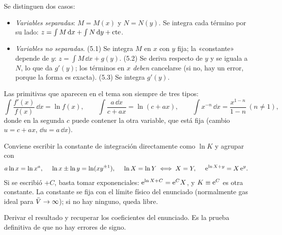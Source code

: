  Se distinguen dos casos:
\begin{itemize}[leftmargin=1.6em]
\item[\textbf{\color{navy}A.}] \emph{Variables separadas}: $M=M(x)$ y $N=N(y)$. Se integra cada término
  por su lado: $z=\int M\,\mathrm{d} x+\int N\,\mathrm{d} y+\mathrm{cte}$.
\item[\textbf{\color{navy}B.}] \emph{Variables no separadas}. (5.1) Se integra $M$ en $x$ con $y$ fija;
  la «constante» depende de $y$: $z=\int M\,\dd x+g(y)$. (5.2) Se deriva respecto de $y$ y se iguala a
  $N$, lo que da $g'(y)$; los términos en $x$ \emph{deben} cancelarse (si no, hay un error, porque la
  forma es exacta). (5.3) Se integra $g'(y)$.
\end{itemize}
Las primitivas que aparecen en el tema son siempre de tres tipos:
\begin{equation}\label{eq:primitivas}
  \int\frac{f'(x)}{f(x)}\,\dd x=\ln f(x),\qquad
  \int\frac{a\,\dd x}{c+ax}=\ln(c+ax),\qquad
  \int x^{-n}\,\dd x=\frac{x^{1-n}}{1-n}\ (n\neq1),
\end{equation}
donde en la segunda $c$ puede contener la otra variable, que está fija (cambio $u=c+ax$, $\dd u=a\,\dd x$).

 Conviene escribir la constante de integración
directamente como $\ln K$ y agrupar con
\begin{equation}\label{eq:logs}
  a\ln x=\ln x^a,\quad\ \ln x\pm\ln y=\ln(xy^{\pm1}),\quad\ 
  \ln X=\ln Y\iff X=Y,\quad\ \e^{\ln X+y}=X\,\e^{y}.
\end{equation}
Si se escribió $+C$, basta tomar exponenciales: $\mathrm{e}^{\ln X+C}=\mathrm{e}^{C}X$, y $K\equiv\mathrm{e}^C$ es otra
constante. La constante se fija con el límite físico del enunciado (normalmente gas ideal para
$\bar{V}\to\infty$); si no hay ninguno, queda libre.

 Derivar el resultado y recuperar los coeficientes del enunciado. Es la
prueba definitiva de que no hay errores de signo.

